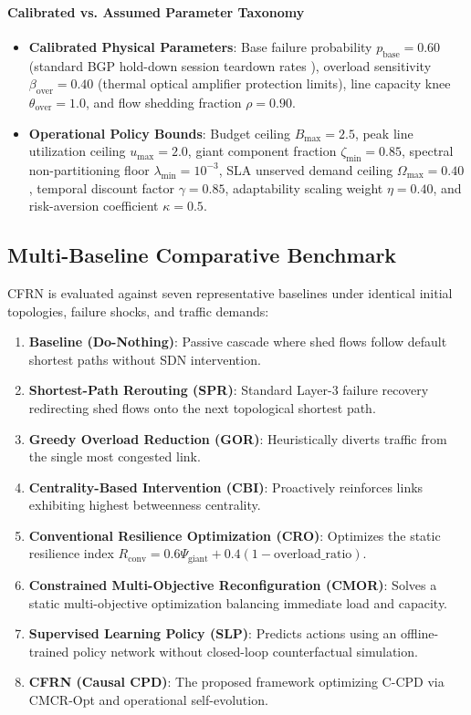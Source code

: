\documentclass[pdflatex,sn-mathphys-num]{sn-jnl}
\theoremstyle{thmstyleone}
\theoremstyle{thmstyletwo}
\theoremstyle{thmstylethree}
\begin{document}
\paragraph{Calibrated vs. Assumed Parameter Taxonomy}
\begin{itemize}
    \item \textbf{Calibrated Physical Parameters}: Base failure probability $p_{\mathrm{base}} = 0.60$ (standard BGP hold-down session teardown rates \cite{caesar2005bgp}), overload sensitivity $\beta_{\mathrm{over}} = 0.40$ (thermal optical amplifier protection limits), line capacity knee $\theta_{\mathrm{over}} = 1.0$, and flow shedding fraction $\rho = 0.90$.
    \item \textbf{Operational Policy Bounds}: Budget ceiling $B_{\max} = 2.5$, peak line utilization ceiling $u_{\max} = 2.0$, giant component fraction $\zeta_{\min} = 0.85$, spectral non-partitioning floor $\lambda_{\min} = 10^{-3}$, SLA unserved demand ceiling $\Omega_{\max} = 0.40$, temporal discount factor $\gamma = 0.85$, adaptability scaling weight $\eta = 0.40$, and risk-aversion coefficient $\kappa = 0.5$.
\end{itemize}

\subsection{Multi-Baseline Comparative Benchmark}
CFRN is evaluated against seven representative baselines under identical initial topologies, failure shocks, and traffic demands:
\begin{enumerate}
    \item \textbf{Baseline (Do-Nothing)}: Passive cascade where shed flows follow default shortest paths without SDN intervention.
    \item \textbf{Shortest-Path Rerouting (SPR)}: Standard Layer-3 failure recovery redirecting shed flows onto the next topological shortest path.
    \item \textbf{Greedy Overload Reduction (GOR)}: Heuristically diverts traffic from the single most congested link.
    \item \textbf{Centrality-Based Intervention (CBI)}: Proactively reinforces links exhibiting highest betweenness centrality.
    \item \textbf{Conventional Resilience Optimization (CRO)}: Optimizes the static resilience index $R_{\mathrm{conv}} = 0.6 \Psi_{\mathrm{giant}} + 0.4(1 - \mathrm{overload\_ratio})$.
    \item \textbf{Constrained Multi-Objective Reconfiguration (CMOR)}: Solves a static multi-objective optimization balancing immediate load and capacity.
    \item \textbf{Supervised Learning Policy (SLP)}: Predicts actions using an offline-trained policy network without closed-loop counterfactual simulation.
    \item \textbf{CFRN (Causal CPD)}: The proposed framework optimizing C-CPD via CMCR-Opt and operational self-evolution.
\end{enumerate}
\end{document}

